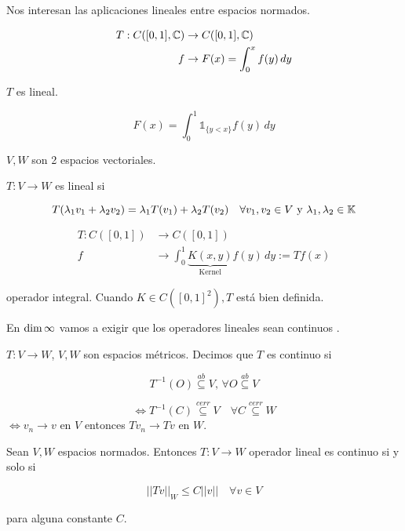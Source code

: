 \documentclass[../Apunte.tex]{subfiles}
\begin{document}
Nos interesan las aplicaciones lineales entre espacios normados.

\begin{fexample}
    \begin{align*}T:C([0,1],\mathbb{C})&\to C([0,1],\mathbb{C})\\
    f&\to F(x)=\int_0^x f(y)\, dy\end{align*}

    $T$ es lineal.

    \[F(x)=\int_0^1 \mathds{1}_{\{y<x\}} f(y)\,dy\]
\end{fexample}

\begin{fdefinition}
    $V,W$ son 2 espacios vectoriales.

    $T:V\to W$ es lineal si 

    \[T(\lambda_1 v_1+\lambda_2 v_2)=\lambda_1 T(v_1)+\lambda_2 T(v_2)\quad \forall v_1,v_2\in V\text{ y } \lambda_1,\lambda_2\in \mathbb{K}\]

\end{fdefinition}

\begin{align*}T:C([0,1])&\to C([0,1])\\
f&\to \int_0^1 \underbrace{K(x,y)}_{\text{Kernel}} f(y)\,dy:=Tf(x)\end{align*}

operador integral. Cuando $K\in C([0,1]^2), T$ está bien definida.

En $\operatorname{dim} \infty$ vamos a exigir que los operadores lineales sean \color{red} continuos \color{black}.

\begin{fdefinition}
    $T:V\to W$, $V,W$ son espacios métricos. Decimos que $T$ es continuo si
    
    \[T^{-1}(O)\overset{ab}{\subseteq} V,\, \forall O\overset{ab}{\subseteq} V\]

    \[\iff T^{-1}(C)\overset{cerr}{\subseteq} V\quad \forall C\overset{cerr}{\subseteq} W\]
    $\iff v_n\to v$ en $V$ entonces $Tv_n\to Tv$ en $W$.
\end{fdefinition}

\begin{ftheorem}
    Sean $V,W$ espacios normados. Entonces $T:V\to W$ operador lineal es continuo si y solo si

    \begin{equation}||Tv||_W\leq C||v||\quad \forall v\in V\end{equation}

    para alguna constante $C$.
\end{ftheorem}
\end{document}
